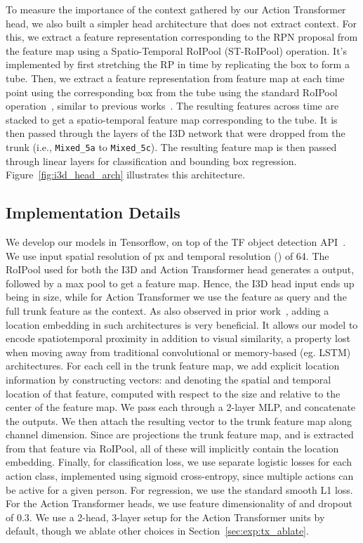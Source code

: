 \documentclass[10pt,twocolumn,letterpaper]{article}
\newcommand{\Tx}[0]{Action Transformer}
\newcommand{\st}[0]{spatiotemporal }
\begin{document}
To measure the importance of the context gathered by our \Tx{} head, we also built a 
simpler head architecture that does not extract context.
For this, we extract a feature representation corresponding to the RPN proposal from the feature map using a Spatio-Temporal RoIPool (ST-RoIPool) operation. It's implemented by
first stretching the RP in time by replicating the box to form a tube. Then, we extract a feature representation from feature map at each time point using the corresponding box from the tube using the standard RoIPool operation~\cite{huang2017speed}, similar to previous works~\cite{girdhar2018detecttrack}. The resulting features across time are stacked to get a spatio-temporal feature map corresponding to the tube. 
It is then passed through the layers of the I3D network that were dropped from the trunk (i.e., {\tt Mixed\_5a} to {\tt Mixed\_5c}). The resulting feature map is then passed through linear layers for classification and bounding box regression.
Figure~\ref{fig:i3d_head_arch} illustrates this architecture.


\subsection{Implementation Details}\label{sec:app:impl}
We develop our models in Tensorflow, on top of the TF object detection
API~\cite{huang2017speed}. We use input spatial resolution of
px and temporal resolution () of 64.  The RoIPool
used for both the I3D and \Tx{} head generates a  output,
followed by a max pool to get a  feature map. Hence, the
I3D head input ends up being  in size, while for
\Tx{} we use the  feature as query and the full  trunk feature as the context.  
As also observed in prior work~\cite{vaswani2017attention,parmar2018image},
adding a location embedding in such architectures is very beneficial.
It allows our model to encode \st{} proximity in addition
to visual similarity, a property lost when moving away from traditional convolutional
or memory-based (eg. LSTM) architectures.
For each cell in the trunk feature map, we add explicit location information by constructing
vectors:  and  denoting the spatial and temporal location
of that feature, computed with respect to the size and relative to the center of the feature map. 
We pass each through a 2-layer MLP, and concatenate
the outputs. We then attach the resulting vector to the trunk feature
map along channel dimension.  Since 
are projections the trunk feature map, and  is extracted from that
feature via RoIPool, all of these will implicitly contain the location
embedding.
Finally, for classification loss, we use separate logistic losses for each action
class, implemented using sigmoid cross-entropy, since multiple actions can be active
for a given person. For regression,
we use the standard smooth L1 loss.  For the \Tx{} heads, we use
feature dimensionality of  and dropout of 0.3. We use a 2-head,
3-layer setup for the \Tx{} units by default, though we ablate other
choices in Section~\ref{sec:exp:tx_ablate}.
\end{document}
